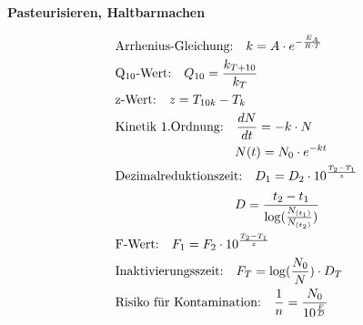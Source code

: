 \begin{minipage}[t]{.35\textwidth}
\vspace*{2mm}
\textbf{Pasteurisieren, Haltbarmachen} \par \vspace*{-4mm}
\begin{align*}
&\text{Arrhenius-Gleichung:} \quad k = A \cdot e^{-\frac{E_A}{R \cdot T}} \\
&\text{Q$_{10}$-Wert:} \quad Q_{10} = \frac{k_{T+10}}{k_T} \\
&\text{z-Wert:} \quad z = T_{10k} - T_k \\
&\text{Kinetik 1.Ordnung:} \quad \frac{dN}{dt} = -k \cdot N \\
& \hspace*{3.3cm} N(t) = N_0 \cdot e^{-kt} \\
&\text{Dezimalreduktionszeit:} \quad D_1 = D_2 \cdot 10^{\frac{T_2 - T_1}{z}} \\[2pt]
&\hspace*{3.3cm} D = \frac{t_2-t_1}{\log(\frac{N_{(t_1)}}{N_{(t_2)}})} \\
&\text{F-Wert:} \quad F_1 = F_2 \cdot 10^{\frac{T_2 - T_1}{z}} \\
&\text{Inaktivierungsszeit:} \quad F_T = \log(\frac{N_0}{N}) \cdot D_T \\
&\text{Risiko für Kontamination:} \quad \frac{1}{n} = \frac{N_0}{10^{\frac{F}{D}}} 
\end{align*}
\end{minipage}